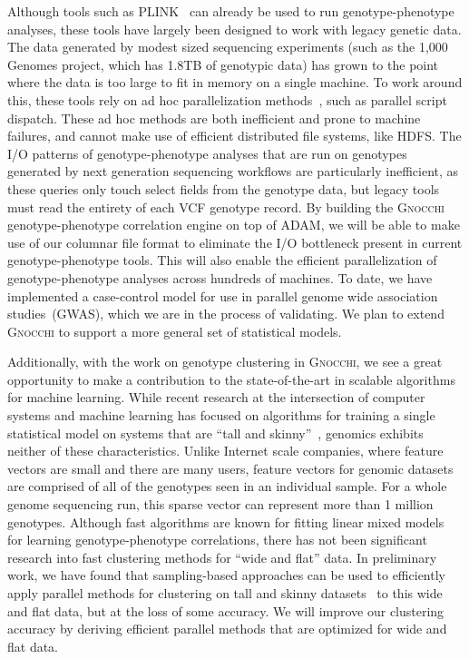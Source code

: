 \documentclass[11pt]{article} %
\begin{document}
Although tools such as \textsc{PLINK}~\cite{chang15, purcell07} can already be used to run
genotype-phenotype analyses, these tools have largely been designed to work with legacy genetic
data. The data generated by modest sized sequencing experiments (such as the 1,000 Genomes project,
which has 1.8TB of genotypic data) has grown to the point where the data is too large to fit in
memory on a single machine. To work around this, these tools rely on ad hoc parallelization
methods~\cite{chang15}, such as parallel script dispatch. These ad hoc methods are both
inefficient and prone to machine failures, and cannot make use of efficient distributed file
systems, like \textsc{HDFS}. The I/O patterns of genotype-phenotype analyses that are run on
genotypes generated by next generation sequencing workflows are particularly inefficient, as
these queries only touch select fields from the genotype data, but legacy tools must read the
entirety of each
VCF genotype record. By building the \textsc{Gnocchi} genotype-phenotype correlation engine on top
of \textsc{ADAM}, we will be able to make use of our columnar file format to eliminate the I/O
bottleneck present in current genotype-phenotype tools. This will also enable the efficient parallelization
of genotype-phenotype analyses across hundreds of machines. To date, we have implemented a case-control
model for use in parallel genome wide association studies~(GWAS), which we are in the process of
validating. We plan to extend \textsc{Gnocchi} to support a more general set of statistical models.

Additionally, with the work on genotype clustering in \textsc{Gnocchi}, we see a great
opportunity to make a contribution to the state-of-the-art in scalable algorithms for machine
learning. While recent research at the intersection of computer systems and machine learning
has focused on algorithms for training a single statistical model on systems that are ``tall
and skinny''~\cite{meng15, zadeh15}, genomics exhibits neither of these characteristics.
Unlike Internet scale companies, where feature vectors are small and there are many users,
feature vectors for genomic datasets are comprised of all of the genotypes seen in an
individual sample. For a whole genome sequencing run, this sparse vector can represent more
than 1 million genotypes. Although fast algorithms are known for fitting linear mixed
models~\cite{lippert11} for learning genotype-phenotype correlations, there has not been
significant research into fast clustering methods for ``wide and flat'' data. In preliminary
work, we have found that sampling-based approaches can be used to efficiently apply parallel
methods for clustering on tall and skinny datasets~\cite{bahmani12, meng15} to this wide and
flat data, but at the loss of some accuracy. We will improve our clustering accuracy by deriving
efficient parallel methods that are optimized for wide and flat data.
\end{document}
